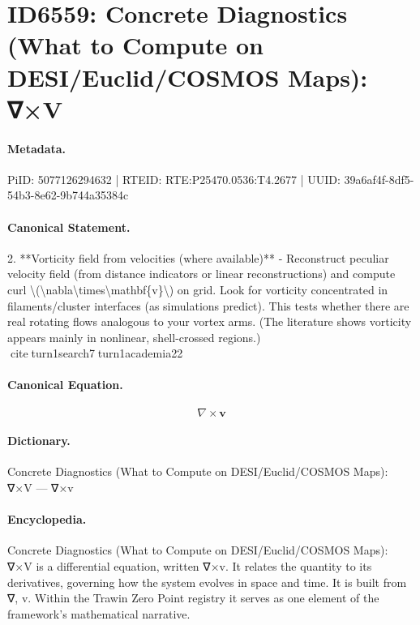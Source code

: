 \section*{ID6559: Concrete Diagnostics (What to Compute on DESI/Euclid/COSMOS Maps): ∇×V}
\paragraph{Metadata.}
PiID: 5077126294632 | RTEID: RTE:P25470.0536:T4.2677 | UUID: 39a6af4f-8df5-54b3-8e62-9b744a35384c

\paragraph{Canonical Statement.}
2. **Vorticity field from velocities (where available)** - Reconstruct peculiar velocity field (from distance indicators or linear reconstructions) and compute curl \textbackslash{}(\textbackslash{}nabla\textbackslash{}times\textbackslash{}mathbf\{v\}\textbackslash{}) on grid. Look for vorticity concentrated in filaments/cluster interfaces (as simulations predict). This tests whether there are real rotating flows analogous to your vortex arms. (The literature shows vorticity appears mainly in nonlinear, shell-crossed regions.) citeturn1search7turn1academia22

\paragraph{Canonical Equation.}
\[
\nabla\times\mathbf{v}
\]

\paragraph{Dictionary.}
Concrete Diagnostics (What to Compute on DESI/Euclid/COSMOS Maps): ∇×V — ∇×v

\paragraph{Encyclopedia.}
Concrete Diagnostics (What to Compute on DESI/Euclid/COSMOS Maps): ∇×V is a differential equation, written ∇×v. It relates the quantity to its derivatives, governing how the system evolves in space and time. It is built from ∇, v. Within the Trawin Zero Point registry it serves as one element of the framework's mathematical narrative.
